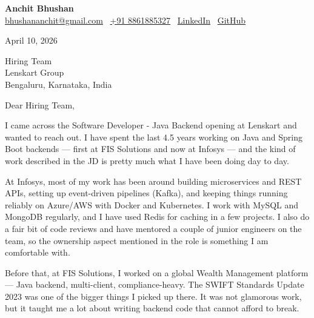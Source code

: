 \documentclass[letterpaper,11pt]{article}
\begin{document}
\begin{center}
    {\huge \textbf{Anchit Bhushan}} \\[4pt]
    \href{mailto:bhushananchit@gmail.com}{bhushananchit@gmail.com} \quad
    \faMobilePhone\ \href{tel:+918861885327}{+91 8861885327} \quad
    \faLinkedin\ \href{https://www.linkedin.com/in/anchit-bhushan-b06692130}{LinkedIn} \quad
    \faGithub\ \href{https://github.com/Anchit1234-debug}{GitHub}
\end{center}

\vspace{8pt}

\noindent April 10, 2026

\vspace{8pt}

\noindent Hiring Team \\
Lenskart Group \\
Bengaluru, Karnataka, India

\vspace{12pt}

\noindent Dear Hiring Team,

\vspace{8pt}

I came across the Software Developer - Java Backend opening at Lenskart and wanted to reach out. I have spent the last 4.5 years working on Java and Spring Boot backends — first at FIS Solutions and now at Infosys — and the kind of work described in the JD is pretty much what I have been doing day to day.

\vspace{8pt}

At Infosys, most of my work has been around building microservices and REST APIs, setting up event-driven pipelines (Kafka), and keeping things running reliably on Azure/AWS with Docker and Kubernetes. I work with MySQL and MongoDB regularly, and I have used Redis for caching in a few projects. I also do a fair bit of code reviews and have mentored a couple of junior engineers on the team, so the ownership aspect mentioned in the role is something I am comfortable with.

\vspace{8pt}

Before that, at FIS Solutions, I worked on a global Wealth Management platform — Java backend, multi-client, compliance-heavy. The SWIFT Standards Update 2023 was one of the bigger things I picked up there. It was not glamorous work, but it taught me a lot about writing backend code that cannot afford to break.
\end{document}
